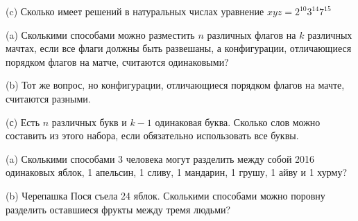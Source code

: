 \begin{problems}
(c) Сколько имеет решений в натуральных числах уравнение $xyz=2^{10}3^{14}7^{15}$

\item 
(a) Сколькими способами можно разместить $n$ различных флагов на $k$ различных мачтах, если все флаги должны быть развешаны, а конфигурации, отличающиеся порядком флагов на матче, считаются одинаковыми?

(b) Тот же вопрос, но конфигурации, отличающиеся порядком флагов на мачте, считаются разными.

(с) Есть $n$ различных букв и $k-1$ одинаковая буква. Сколько слов можно составить из этого набора, если обязательно использовать все буквы.

\item (a) Сколькими способами 3 человека могут разделить между собой 2016 одинаковых яблок, 1 апельсин, 1 сливу, 1 мандарин, 1 грушу, 1 айву и 1 хурму?

(b) Черепашка Пося съела 24 яблок. Сколькими способами можно поровну разделить оставшиеся фрукты между тремя людьми?



\end{problems}
